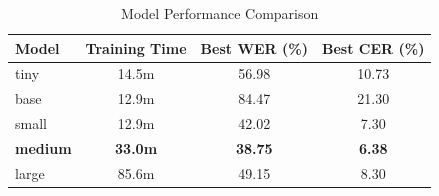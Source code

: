 \begin{table}[htbp]
\centering
\begin{tabular}{lccc}
\hline
\textbf{Model} & \textbf{Training Time} & \textbf{Best WER (\%)} & \textbf{Best CER (\%)} \\
\hline
tiny & 14.5m & 56.98 & 10.73 \\
base & 12.9m & 84.47 & 21.30 \\
small & 12.9m & 42.02 & 7.30 \\
\textbf{medium} & \textbf{33.0m} & \textbf{38.75} & \textbf{6.38} \\
large & 85.6m & 49.15 & 8.30 \\
\hline
\end{tabular}
\caption{Model Performance Comparison}
\label{tab:model_comparison}
\end{table}
